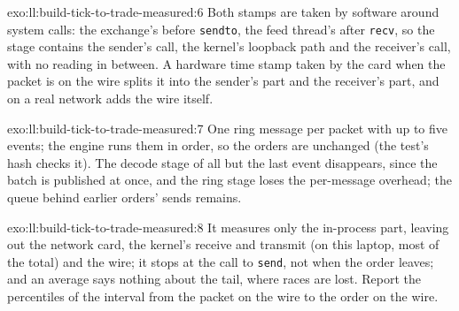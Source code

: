 \begin{solution}{exo:ll:build-tick-to-trade-measured:6}
Both stamps are taken by software around system calls: the exchange's before \texttt{sendto}, the feed thread's after
\texttt{recv}, so the stage contains the sender's call, the kernel's loopback path and the receiver's call, with no reading in
between. A hardware time stamp taken by the card when the packet is on the wire splits it into the sender's part and the
receiver's part, and on a real network adds the wire itself.
\end{solution}

\begin{solution}{exo:ll:build-tick-to-trade-measured:7}
One ring message per packet with up to five events; the engine runs them in order, so the orders are unchanged (the test's hash
checks it). The decode stage of all but the last event disappears, since the batch is published at once, and the ring stage
loses the per-message overhead; the queue behind earlier orders' sends remains.
\end{solution}

\begin{solution}{exo:ll:build-tick-to-trade-measured:8}
It measures only the in-process part, leaving out the network card, the kernel's receive and transmit (on this laptop, most of
the total) and the wire; it stops at the call to \texttt{send}, not when the order leaves; and an average says nothing about the
tail, where races are lost. Report the percentiles of the interval from the packet on the wire to the order on the wire.
\end{solution}

